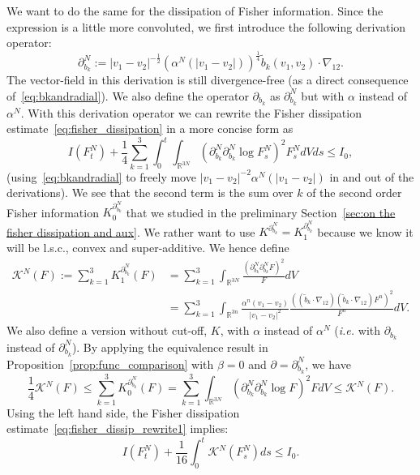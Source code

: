 \documentclass[11pt,a4paper]{article}
\theoremstyle{definition}
\theoremstyle{plain}
\begin{document}
We want to do the same for the dissipation of Fisher information. Since the expression is a little more convoluted, we first introduce the following derivation operator:
\begin{equation}
\label{eq:defpartialNbk}
    \partial^N_{b_k}:=\vert v_1-v_2\vert^{-\frac{1}{2}} (\alpha^N(\vert v_1-v_2\vert ))^{\frac{1}{4}}\tilde{b}_k(v_1,v_2)\cdot \nabla_{12}.
\end{equation}
The vector-field in this derivation is still divergence-free (as a direct consequence of~\eqref{eq:bkandradial}). We also define the operator $\partial_{b_k}$ as $\partial^N_{b_k}$ but with $\alpha$ instead of $\alpha^N$. With this derivation operator we can rewrite the Fisher dissipation estimate~\eqref{eq:fisher_dissipation} in a more concise form as
\begin{equation}
\label{eq:fisher_dissip_rewrite1}
    I(F^N_t)+\frac{1}{4}\sum_{k=1}^3\int_0^t  \int_{\mathbb{R}^{3N}}  \left(\partial^N_{b_k} \partial^N_{b_k}\log F^N_s\right)^2F^N_s dVds \leq I_0,
\end{equation}
(using~\eqref{eq:bkandradial} to freely move $\vert v_1-v_2\vert^{-2} \alpha^N(\vert v_1-v_2\vert )$ in and out of the derivations). We see that the second term is the sum over $k$ of the second order Fisher information $K_0^{\partial^N_{b_k}}$ that we studied in the preliminary Section~\ref{sec:on the fisher dissipation and aux}. We rather want to use $K^{\partial^N_{b_k}}=K_1^{\partial^N_{b_k}}$ because we know it will be l.s.c., convex and super-additive. We hence define
\begin{align}
\label{eq:defK}
    \mathcal{K}^N(F):=\sum_{k=1}^3 K_1^{\partial^N_{b_k}}(F)&=\sum_{k=1}^3 \int_{\mathbb{R}^{3N}} \frac{\left( \partial^N_{b_k} \partial^N_{b_k}F \right)^2}{F} dV\\
    &=\sum_{k=1}^3 \int_{\mathbb{R}^{3n}} \frac{\alpha^n(v_1-v_2)}{\vert v_1-v_2 \vert^2} \frac{\left( (\tilde{b}_k\cdot \nabla_{12})( \tilde{b}_k\cdot \nabla_{12})F^n \right)^2}{F^n} dV.\nonumber
\end{align}
We also define a version without cut-off, $K$, with $\alpha$ instead of $\alpha^N$ (\textit{i.e.} with $\partial_{b_k}$ instead of $\partial^N_{b_k}$).
By applying the equivalence result in Proposition~\ref{prop:func_comparison} with $\beta=0$ and $\partial=\partial^N_{b_k}$, we have
$$\frac{1}{4}\mathcal{K}^N(F) \leq \sum_{k=1}^3 K_0^{\partial^N_{b_k}}(F) = \sum_{k=1}^3 \int_{\mathbb{R}^{3N}}  \left(\partial^N_{b_k} \partial^N_{b_k}\log F\right)^2F dV \leq \mathcal{K}^N(F) . $$
Using the left hand side, the Fisher dissipation estimate~\eqref{eq:fisher_dissip_rewrite1} implies:
\begin{equation}
\label{eq:fisher_dissipation_rewrite}
    I(F^N_t)+\frac{1}{16}\int_0^t \mathcal{K}^N(F^N_s)ds \leq I_0.
\end{equation}
\end{document}
